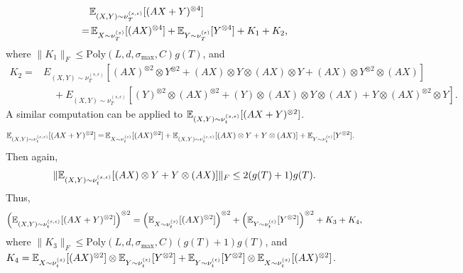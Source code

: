 \begin{align*}
& \mathbb{E}_{(X,Y)\sim \nu_T^{(s,\epsilon)}} [(AX+Y)^{\otimes 4}]\\
 = & \,\mathbb{E}_{X\sim \nu_T^{(s)}}[(AX)^{\otimes 4}] + \mathbb{E}_{Y\sim \nu_T^{(\epsilon)}}[Y^{\otimes 4}] + K_1 +K_2,
\end{align*}
where $\|K_1\|_F \le\text{Poly}(L, d, \sigma_{\max}, C)g(T) $, and 
\begin{align*}
K_2  = & E_{(X,Y)\sim \nu_T^{(s,\epsilon)}} [ (AX)^{\otimes 2}\otimes Y^{\otimes 2} + (AX)\otimes Y\otimes (AX)\otimes Y + (AX)\otimes Y^{\otimes 2}\otimes (AX)]\\
& \quad+  E_{(X,Y)\sim \nu_T^{(s,\epsilon)}} [ (Y)^{\otimes 2}\otimes (AX)^{\otimes 2} + (Y)\otimes (AX)\otimes Y\otimes (AX) + Y\otimes (AX)^{\otimes 2}\otimes Y]. 
\end{align*}
A similar computation can be applied to $\mathbb{E}_{(X,Y)\sim \nu_t^{(s,\epsilon)}} [(AX+Y)^{\otimes 2}]$.
\begin{align*}
\mathbb{E}_{(X,Y)\sim \nu_t^{(s,\epsilon)}} [(AX+Y)^{\otimes 2}]= & \, \mathbb{E}_{X\sim \nu_t^{(s)}}[(AX)^{\otimes 2}] + \mathbb{E}_{(X,Y)\sim \nu_t^{(s,\epsilon)}}[(AX)\otimes Y + Y\otimes (AX)] + \mathbb{E}_{Y\sim \nu_t^{(\epsilon)}}[Y^{\otimes 2}].
\end{align*}
Then again,
\[
\|\mathbb{E}_{(X,Y)\sim \nu_t^{(s,\epsilon)}}[(AX)\otimes Y + Y\otimes (AX)]\|_F \le 2(g(T)+1)g(T).
\]
Thus, 
\[
\left( \mathbb{E}_{(X,Y)\sim \nu_t^{(s,\epsilon)}} [(AX+Y)^{\otimes 2}]\right)^{\otimes2} =  \left(\mathbb{E}_{X\sim \nu_t^{(s)}}[(AX)^{\otimes 2}]\right)^{\otimes2} + \left( \mathbb{E}_{Y\sim \nu_t^{(\epsilon)}}[Y^{\otimes 2}]\right)^{\otimes 2} + K_3+K_4,
\]
where $\|K_3\|_F \le \text{Poly}(L, d, \sigma_{\max}, C)(g(T)+1)g(T) $, and $K_4 = \mathbb{E}_{X\sim \nu_t^{(s)}}[(AX)^{\otimes 2}] \otimes \mathbb{E}_{Y\sim \nu_t^{(\epsilon)}}[Y^{\otimes 2}] + \mathbb{E}_{Y\sim \nu_t^{(\epsilon)}}[Y^{\otimes 2}] \otimes \mathbb{E}_{X\sim \nu_t^{(s)}}[(AX)^{\otimes 2}]$.

